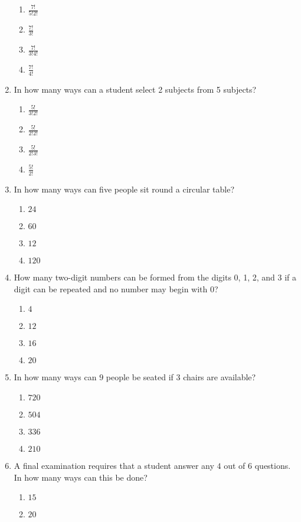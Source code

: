 \begin{multicols}{2}
\begin{enumerate}[label={\arabic*.}]
\begin{enumerate}[label={\Alph*.}]
	\item \(\frac{7!}{5!2!}\)
	\item \(\frac{7!}{3!}\)
	\item \(\frac{7!}{3!4!}\)
	\item \(\frac{7!}{4!}\)
	\end{enumerate}
\item In how many ways can a student select 2 subjects from 5 subjects?
	\begin{enumerate}[label={\Alph*.}]
	\item \(\frac{5!}{3!2!}\)
	\item \(\frac{5!}{2!2!}\)
	\item \(\frac{5!}{2!3!}\)
	\item \(\frac{5!}{2!}\)
	\end{enumerate}
\item In how many ways can five people sit round a circular table?
	\begin{enumerate}[label={\Alph*.}]
	\item \(24\)
	\item \(60\)
	\item \(12\)
	\item \(120\)
	\end{enumerate}
\item How many two-digit numbers can be formed from the digits 0, 1, 2, and 3 if a digit can be repeated and no number may begin with 0?
	\begin{enumerate}[label={\Alph*.}]
	\item \(4\)
	\item \(12\)
	\item \(16\)
	\item \(20\)
	\end{enumerate}
\item In how many ways can \(9\) people be seated if \(3\) chairs are available?
	\begin{enumerate}[label={\Alph*.}]
	\item \(720\)
	\item \(504\)
	\item \(336\)
	\item \(210\)
	\end{enumerate}
\item A final examination requires that a student answer any \(4\) out of \(6\) questions. In how many ways can this be done?
	\begin{enumerate}[label={\Alph*.}]
	\item \(15\)
	\item \(20\)

\end{enumerate}
\end{enumerate}
\end{multicols}
